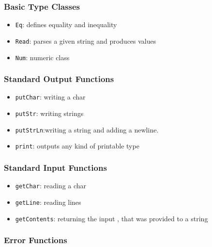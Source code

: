 \documentclass[a4paper, titlepage, twoside]{article}
\begin{document}
\subsubsection{Basic Type Classes}
\label{sec:org98a160f}

\begin{itemize}
\item \texttt{Eq}: defines equality and inequality

\item \texttt{Read}: parses a given string and produces values

\item \texttt{Num}: numeric class
\end{itemize}

\subsubsection{Standard Output Functions}
\label{sec:org7b8f863}

\begin{itemize}
\item \texttt{putChar}: writing a char

\item \texttt{putStr}: writing strings

\item \texttt{putStrLn}:writing a string and adding a newline.

\item \texttt{print}: outputs any kind of printable type
\end{itemize}

\subsubsection{Standard Input Functions}
\label{sec:org8fb49dd}

\begin{itemize}
\item \texttt{getChar}: reading a char

\item \texttt{getLine}: reading lines

\item \texttt{getContents}: returning the input , that was provided to a string
\end{itemize}

\subsubsection{Error Functions}
\label{sec:org99a8cc6}
\end{document}
